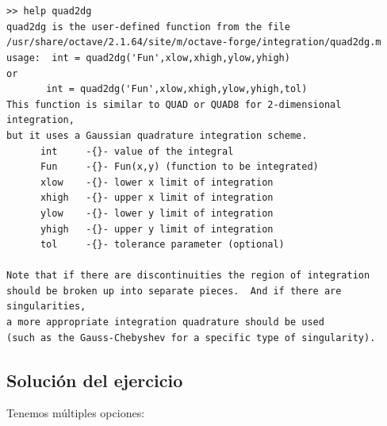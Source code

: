   \begin{verbatim}


>> help quad2dg
quad2dg is the user-defined function from the file
/usr/share/octave/2.1.64/site/m/octave-forge/integration/quad2dg.m   
usage:  int = quad2dg('Fun',xlow,xhigh,ylow,yhigh)
or
       int = quad2dg('Fun',xlow,xhigh,ylow,yhigh,tol)   
This function is similar to QUAD or QUAD8 for 2-dimensional integration,
but it uses a Gaussian quadrature integration scheme.
      int     -{}- value of the integral
      Fun     -{}- Fun(x,y) (function to be integrated)
      xlow    -{}- lower x limit of integration
      xhigh   -{}- upper x limit of integration
      ylow    -{}- lower y limit of integration
      yhigh   -{}- upper y limit of integration
      tol     -{}- tolerance parameter (optional)   
  
Note that if there are discontinuities the region of integration
should be broken up into separate pieces.  And if there are singularities,
a more appropriate integration quadrature should be used
(such as the Gauss-Chebyshev for a specific type of singularity).
 \end{verbatim}

\subsection{Solución del ejercicio}

Tenemos múltiples opciones:

